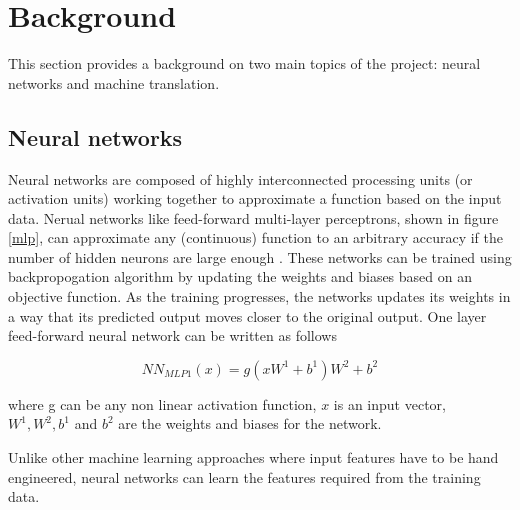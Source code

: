 \section{Background}
This section provides a background on two main topics of the project: neural networks and machine translation. 

\subsection{Neural networks}
Neural networks are composed of highly interconnected processing units (or activation units) working together to approximate a function based on the input data. Nerual networks like feed-forward multi-layer perceptrons, shown in figure \ref{mlp}, can approximate any (continuous) function to an arbitrary accuracy if the number of hidden neurons are large enough \citep{hornik1989multilayer}. These networks can be trained using backpropogation algorithm \citep{rumelhart1988learning} by updating the weights and biases based on an objective function. As the training progresses, the networks updates its weights in a way that its predicted output moves closer to the original output. One layer feed-forward neural network can be written as follows


\begin{equation}
NN_{MLP1} (x) = g(xW^1 + b^1 )W^2 + b^2
\end{equation}

where g can be any non linear activation function, $x$ is an input vector, $W^1, W^2, b^1$ and  $b^2$ are the weights and biases for the network.

Unlike other machine learning approaches where input features have to be hand engineered, neural networks can learn the features required from the training data. 

